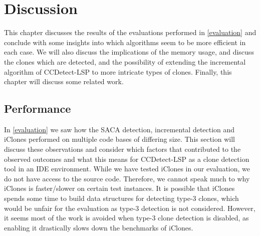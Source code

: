 \chapter{Discussion}
\label{discussion}

This chapter discusses the results of the evaluations performed in \cref{evaluation} and
conclude with some insights into which algorithms seem to be more efficient in each case.
We will also discuss the implications of the memory usage, and discuss the clones which
are detected, and the possibility of extending the incremental algorithm of CCDetect-LSP
to more intricate types of clones. Finally, this chapter will discuss some related work.

\section{Performance}

In \cref{evaluation} we saw how the SACA detection, incremental detection and iClones
performed on multiple code bases of differing size. This section will discuss these
observations and consider which factors that contributed to the observed outcomes and what
this means for CCDetect-LSP as a clone detection tool in an IDE environment. While we have
tested iClones in our evaluation, we do not have access to the source code. Therefore, we
cannot speak much to why iClones is faster/slower on certain test instances. It is
possible that iClones spends some time to build data structures for detecting type-3
clones, which would be unfair for the evaluation as type-3 detection is not considered.
However, it seems most of the work is avoided when type-3 clone detection is disabled, as
enabling it drastically slows down the benchmarks of iClones.


